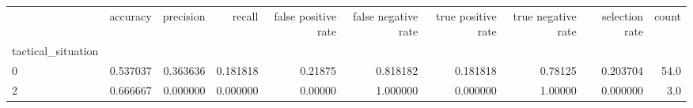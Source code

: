 \begin{tabular}{lrrrrrrrrr}
\toprule
{} &  accuracy &  precision &    recall &  false positive rate &  false negative rate &  true positive rate &  true negative rate &  selection rate &  count \\
tactical\_situation &           &            &           &                      &                      &                     &                     &                 &        \\
\midrule
0                  &  0.537037 &   0.363636 &  0.181818 &              0.21875 &             0.818182 &            0.181818 &             0.78125 &        0.203704 &   54.0 \\
2                  &  0.666667 &   0.000000 &  0.000000 &              0.00000 &             1.000000 &            0.000000 &             1.00000 &        0.000000 &    3.0 \\
\bottomrule
\end{tabular}
